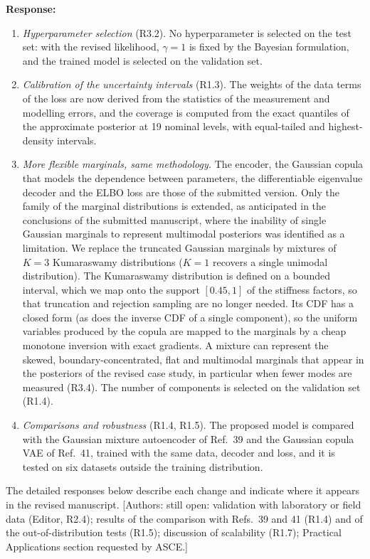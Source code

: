 \documentclass[11pt]{article}
\newenvironment{response}{\par\smallskip\noindent\color{resp}\textbf{Response:}\ }{\par}
\newcommand{\authornote}[1]{\textcolor{note}{\textsf{[Authors: #1]}}}
\begin{document}
\begin{response}
\begin{enumerate}[leftmargin=*]
\item \emph{Hyperparameter selection} (R3.2). No hyperparameter is selected on the test set: with the revised
likelihood, $\gamma=1$ is fixed by the Bayesian formulation, and the trained model is selected on the validation set.
\item \emph{Calibration of the uncertainty intervals} (R1.3). The weights of the data terms of the loss are now derived
from the statistics of the measurement and modelling errors, and the coverage is computed from the exact quantiles of
the approximate posterior at 19 nominal levels, with equal-tailed and highest-density intervals.
\item \emph{More flexible marginals, same methodology.} The encoder, the Gaussian copula that models the dependence
between parameters, the differentiable eigenvalue decoder and the ELBO loss are those of the submitted version. Only the
family of the marginal distributions is extended, as anticipated in the conclusions of the submitted manuscript, where
the inability of single Gaussian marginals to represent multimodal posteriors was identified as a limitation. We
replace the truncated Gaussian marginals by mixtures of $K=3$ Kumaraswamy distributions ($K=1$ recovers a single
unimodal distribution). The Kumaraswamy distribution is defined on a bounded interval, which we map onto the support
$[0.45,1]$ of the stiffness factors, so that truncation and rejection sampling are no longer needed. Its CDF has a
closed form (as does the inverse CDF of a single component), so the uniform variables produced by the copula are mapped
to the marginals by a cheap monotone inversion with exact gradients. A mixture can represent the skewed,
boundary-concentrated, flat and multimodal marginals that appear in the posteriors of the revised case study, in
particular when fewer modes are measured (R3.4). The number of components is selected on the validation set
(R1.4).
\item \emph{Comparisons and robustness} (R1.4, R1.5). The proposed model is compared with the Gaussian mixture
autoencoder of Ref.~39 and the Gaussian copula VAE of Ref.~41, trained with the same data, decoder and loss, and it is
tested on six datasets outside the training distribution.
\end{enumerate}
The detailed responses below describe each change and indicate where it appears in the revised manuscript.
\authornote{still open: validation with laboratory or field data (Editor, R2.4); results of the comparison with Refs.~39
and 41 (R1.4) and of the out-of-distribution tests (R1.5); discussion of scalability (R1.7); Practical Applications
section requested by ASCE.}
\end{response}
\end{document}
